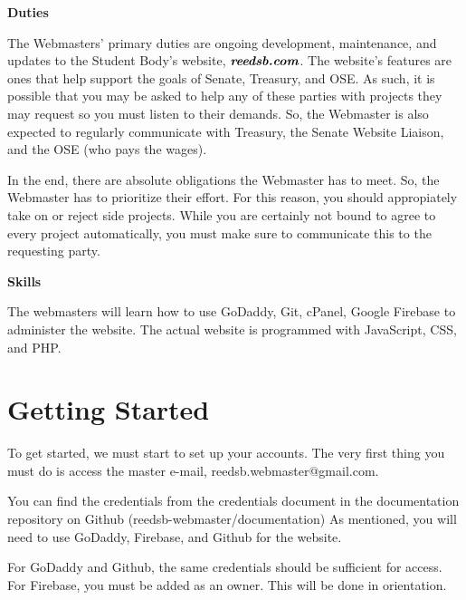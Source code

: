 \documentclass[a4paper]{article}
\begin{document}
\newpage
\medskip
\begin{center}
\textbf{Duties}
\end{center}
The Webmasters' primary duties are ongoing development, maintenance, and updates to the Student Body’s website, $\textbf{\textit{reedsb.com}}$. The website's features are ones that help support the goals of Senate, Treasury, and OSE. As such, it is possible that you may be asked to help any of these parties with projects they may request so you must listen to their demands. So, the Webmaster is also expected to regularly communicate with Treasury, the Senate Website Liaison, and the OSE (who pays the wages).

\begin{remark*}[Prioritize.]
In the end, there are absolute obligations the Webmaster has to meet. So, the Webmaster has to prioritize their effort. For this reason, you should appropiately take on or reject side projects. While you are certainly not bound to agree to every project automatically, you must make sure to communicate this to the requesting party.
\end{remark*}



\begin{center}
\textbf{Skills}
\end{center}
The webmasters will learn how to use GoDaddy, Git, cPanel, Google Firebase to administer the website. The actual website is programmed with JavaScript, CSS, and PHP. \newline

\section{Getting Started}
To get started, we must start to set up your accounts. The very first thing you must do is access the master e-mail, reedsb.webmaster@gmail.com.

You can find the credentials from the credentials document in the documentation repository on Github (reedsb-webmaster/documentation) As mentioned, you will need to use GoDaddy, Firebase, and Github for the website.

For GoDaddy and Github, the same credentials should be sufficient for access. For Firebase, you must be added as an owner. This will be done in orientation.
\end{document}
